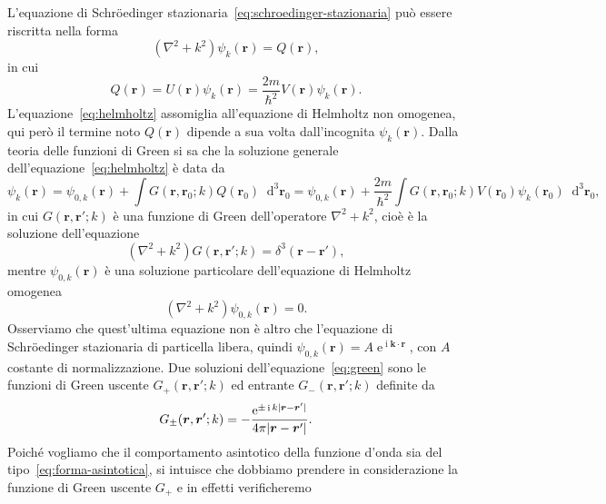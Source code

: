\documentclass[a4paper,fleqn,twoside,12pt]{article}
\newcommand*{\dd}{\mathop{}\!\mathrm{d}} %
\DeclareMathOperator{\e}{\mathrm{e}} %
\DeclareMathOperator{\uimm}{\mathrm{i}} %
\DeclarePairedDelimiter{\abs}{\lvert}{\rvert}
\begin{document}
L'equazione di Schröedinger stazionaria~\eqref{eq:schroedinger-stazionaria} può
essere riscritta nella forma
\begin{equation}
  \label{eq:helmholtz}
  (\nabla^{2} + k^{2})\psi_{k}(\bm{r}) = Q(\bm{r}),
\end{equation}
in cui
\begin{equation}
  Q(\bm{r}) = U(\bm{r})\psi_{k}(\bm{r}) =
  \frac{2m}{\hslash^{2}}V(\bm{r})\psi_{k}(\bm{r}).
\end{equation}
L'equazione~\eqref{eq:helmholtz} assomiglia all'equazione di Helmholtz non
omogenea, qui però il termine noto $Q(\bm{r})$ dipende a sua volta
dall'incognita $\psi_{k}(\bm{r})$.
Dalla teoria delle funzioni di Green si sa che la soluzione generale
dell'equazione~\eqref{eq:helmholtz} è data da
\begin{equation}
  \psi_{k}(\bm{r}) = \psi_{0,k}(\bm{r}) + \int
  G(\bm{r},\bm{r}_{0};k)Q(\bm{r}_{0})\dd^{3}\bm{r}_{0} = \psi_{0,k}(\bm{r}) +
  \frac{2m}{\hslash^{2}}\int
  G(\bm{r},\bm{r}_{0};k)V(\bm{r}_{0})\psi_{k}(\bm{r}_{0})\dd^{3}\bm{r}_{0},
\end{equation}
in cui $G(\bm{r},\bm{r}';k)$ è una funzione di Green dell'operatore
$\nabla^{2} + k^{2}$, cioè è la soluzione dell'equazione
\begin{equation}
  \label{eq:green}
  (\nabla^{2} + k^{2})G(\bm{r},\bm{r}';k) = \delta^{3}(\bm{r} - \bm{r}'),
\end{equation}
mentre $\psi_{0,k}(\bm{r})$ è una soluzione particolare dell'equazione di
Helmholtz omogenea
\begin{equation}
  (\nabla^{2} + k^{2})\psi_{0,k}(\bm{r}) = 0.
\end{equation}
Osserviamo che quest'ultima equazione non è altro che l'equazione di
Schröedinger stazionaria di particella libera, quindi
$\psi_{0,k}(\bm{r}) = A\e^{\uimm \bm{k}\cdot\bm{r}}$, con $A$ costante di
normalizzazione.  Due soluzioni dell'equazione~\eqref{eq:green} sono le funzioni
di Green uscente $G_{+}(\bm{r},\bm{r}';k)$ ed entrante $G_{-}(\bm{r},\bm{r}';k)$
definite da
\begin{equation}
  G_{\pm}(\bm{r},\bm{r}';k) = -\frac{\e^{\pm \uimm k\abs{\bm{r} -
        \bm{r}'}}}{4\pi \abs{\bm{r} - \bm{r}'}}.
\end{equation}
Poiché vogliamo che il comportamento asintotico della funzione d'onda sia del
tipo~\eqref{eq:forma-asintotica}, si intuisce che dobbiamo prendere in
considerazione la funzione di Green uscente $G_{+}$ e in effetti verificheremo
\end{document}
